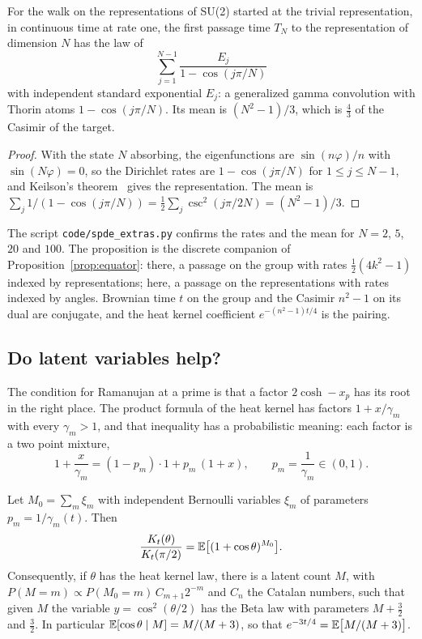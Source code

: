 \begin{proposition}\label{prop:reppassage}
For the walk on the representations of SU(2) started at the trivial representation, in continuous time at rate one, the first passage time $T_N$ to the representation of dimension $N$ has the law of
\[
\sum_{j=1}^{N-1}\frac{E_j}{1-\cos(j\pi/N)}
\]
with independent standard exponential $E_j$: a generalized gamma convolution with Thorin atoms $1-\cos(j\pi/N)$. Its mean is $(N^2-1)/3$, which is $\frac43$ of the Casimir of the target.
\end{proposition}

\begin{proof}
With the state $N$ absorbing, the eigenfunctions are $\sin(n\varphi)/n$ with $\sin(N\varphi)=0$, so the Dirichlet rates are $1-\cos(j\pi/N)$ for $1\le j\le N-1$, and Keilson's theorem~\cite{Ke79} gives the representation. The mean is $\sum_j1/(1-\cos(j\pi/N))=\frac12\sum_j\csc^2(j\pi/2N)=(N^2-1)/3$.
\end{proof}

The script \texttt{code/spde\_extras.py} confirms the rates and the mean for $N=2$, $5$, $20$ and $100$. The proposition is the discrete companion of Proposition~\ref{prop:equator}: there, a passage on the group with rates $\frac12(4k^2-1)$ indexed by representations; here, a passage on the representations with rates indexed by angles. Brownian time $t$ on the group and the Casimir $n^2-1$ on its dual are conjugate, and the heat kernel coefficient $e^{-(n^2-1)t/4}$ is the pairing.

\subsection{Do latent variables help?}

The condition for Ramanujan at a prime is that a factor $2\cosh-x_p$ has its root in the right place. The product formula of the heat kernel has factors $1+x/\gamma_m$ with every $\gamma_m>1$, and that inequality has a probabilistic meaning: each factor is a two point mixture,
\[
1+\frac{x}{\gamma_m}=(1-p_m)\cdot1+p_m\,(1+x),\qquad p_m=\frac1{\gamma_m}\in(0,1).
\]

\begin{proposition}\label{prop:latentcount}
Let $M_0=\sum_m\xi_m$ with independent Bernoulli variables $\xi_m$ of parameters $p_m=1/\gamma_m(t)$. Then
\[
\frac{K_t(\theta)}{K_t(\pi/2)}=\mathbb{E}\big[(1+\cos\theta)^{M_0}\big].
\]
Consequently, if $\theta$ has the heat kernel law, there is a latent count $M$, with $P(M=m)\propto P(M_0=m)\,C_{m+1}2^{-m}$ and $C_n$ the Catalan numbers, such that given $M$ the variable $y=\cos^2(\theta/2)$ has the Beta law with parameters $M+\frac32$ and $\frac32$. In particular $\mathbb{E}[\cos\theta\mid M]=M/(M+3)$, so that $e^{-3t/4}=\mathbb{E}\big[M/(M+3)\big]$.
\end{proposition}

